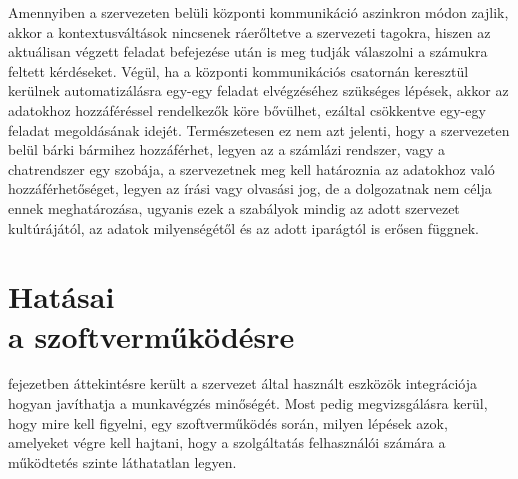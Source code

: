 Amennyiben a szervezeten belüli központi kommunikáció aszinkron módon zajlik, akkor a kontextusváltások nincsenek ráerőltetve a szervezeti tagokra, hiszen az aktuálisan végzett feladat befejezése után is meg tudják válaszolni a számukra feltett kérdéseket.
Végül, ha a központi kommunikációs csatornán keresztül kerülnek automatizálásra egy-egy feladat elvégzéséhez szükséges lépések, akkor az adatokhoz hozzáféréssel rendelkezők köre bővülhet, ezáltal csökkentve egy-egy feladat megoldásának idejét.
Természetesen ez nem azt jelenti, hogy a szervezeten belül bárki bármihez hozzáférhet, legyen az a számlázi rendszer, vagy a chatrendszer egy szobája, a szervezetnek meg kell határoznia az adatokhoz való hozzáférhetőséget, legyen az írási vagy olvasási jog, de a dolgozatnak nem célja ennek meghatározása, ugyanis ezek a szabályok mindig az adott szervezet kultúrájától, az adatok milyenségétől és az adott iparágtól is erősen függnek.

\section{Hatásai\\a szoftverműködésre}
 fejezetben áttekintésre került a szervezet által használt eszközök integrációja hogyan javíthatja a munkavégzés minőségét. Most pedig megvizsgálásra kerül, hogy mire kell figyelni, egy szoftverműködés során, milyen lépések azok, amelyeket végre kell hajtani, hogy a szolgáltatás felhasználói számára a működtetés szinte láthatatlan legyen.


